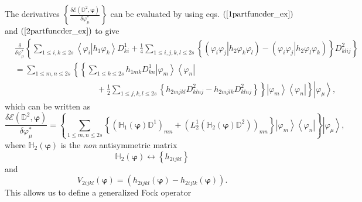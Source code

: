 \documentclass[aps,preprint]{revtex4}%
\begin{document}
The derivatives $\left\{  \frac{\delta\mathcal{E}\left(  \mathbb{D}%
^{2},\mathbf{\varphi}\right)  }{\delta\varphi_{\mu}^{\ast}}\right\}  $ can be
evaluated by using eqs. $\left(  \ref{1partfuncder_ex}\right)  $ and $\left(
\ref{2partfuncder_ex}\right)  $ to give
\begin{align}
&  \frac{\delta}{\delta\varphi_{\mu}^{\ast}}\left\{  \sum_{1\leq i,k\leq
2s}\left\langle \left.  \varphi_{i}\right\vert h_{1}\varphi_{k}\right\rangle
D_{ki}^{1}+\frac{1}{4}\sum_{1\leq i,j,k,l\leq2s}\left\{  \left(  \left.
\varphi_{i}\varphi_{j}\right\vert h_{2}\varphi_{k}\varphi_{l}\right)  -\left(
\left.  \varphi_{i}\varphi_{j}\right\vert h_{2}\varphi_{l}\varphi_{k}\right)
\right\}  D_{klij}^{2}\right\} \nonumber\\
&  =\sum_{1\leq m,n\leq2s}\left\{  \left\{  \sum_{1\leq k\leq2s}h_{1mk}%
D_{kn}^{1}\left\vert \varphi_{m}\right\rangle \left\langle \varphi
_{n}\right\vert \right.  \right. \nonumber\\
&  \qquad\qquad\qquad\qquad\qquad+\left.  \left.  \frac{1}{2}\sum_{1\leq
j,k,l\leq2s}\left\{  h_{2mjkl}D_{klnj}^{2}-h_{2mjlk}D_{klnj}^{2}\right\}
\right\}  \left\vert \varphi_{m}\right\rangle \left\langle \varphi
_{n}\right\vert \right\}  \left\vert \varphi_{\mu}\right\rangle ,
\end{align}
which can be written as
\begin{equation}
\frac{\delta\mathcal{E}\left(  \mathbb{D}^{2},\mathbf{\varphi}\right)
}{\delta\varphi_{\mu}^{\ast}}=\left\{  \sum_{1\leq m,n\leq2s}\left\{  \left(
\mathbb{H}_{1}\left(  \mathbf{\varphi}\right)  \mathbb{D}^{1}\right)
_{mn}+\left(  L_{2}^{1}\left(  \mathbb{H}_{2}\left(  \mathbf{\varphi}\right)
\mathbb{D}^{2}\right)  \right)  _{mn}\right\}  \left\vert \varphi
_{m}\right\rangle \left\langle \varphi_{n}\right\vert \right\}  \left\vert
\varphi_{\mu}\right\rangle ,
\end{equation}
where $\mathbb{H}_{2}\left(  \mathbf{\varphi}\right)  $ is the \emph{non
}antisymmetric matrix
\begin{equation}
\mathbb{H}_{2}\left(  \mathbf{\varphi}\right)  \leftrightarrow\left\{
h_{2ijkl}\right\}
\end{equation}
and
\begin{equation}
V_{2ijkl}\left(  \mathbf{\varphi}\right)  =\left(  h_{2ijkl}\left(
\mathbf{\varphi}\right)  -h_{2ijlk}\left(  \mathbf{\varphi}\right)  \right)  .
\end{equation}
This allows us to define a generalized Fock operator
\end{document}

